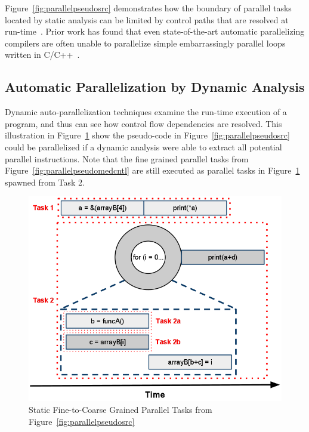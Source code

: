 \documentclass[defaultstyle,11pt]{thesis}
\begin{document}
Figure~\ref{fig:parallelpseudosrc} demonstrates how the boundary of
parallel tasks located by static analysis can be limited by control
paths that are resolved at run-time~\cite{blume:1992:pds}.  Prior work
has found that even state-of-the-art automatic parallelizing compilers
are often unable to parallelize simple embarrassingly parallel loops
written in C/C++~\cite{minjang:10:micro}.

\subsection{Automatic Parallelization by Dynamic Analysis}

Dynamic auto-parallelization techniques examine the run-time execution
of a program, and thus can see how control flow dependencies are
resolved. This illustration in Figure~\ref{fig:parallelpseudocoarse}
show the pseudo-code in Figure~\ref{fig:parallelpseudosrc} could be
parallelized if a dynamic analysis were able to extract all potential
parallel instructions.  Note that the fine grained parallel tasks
from Figure~\ref{fig:parallelpseudomedcntl} are still executed as
parallel tasks in Figure~\ref{fig:parallelpseudocoarse} spawned from
Task 2.

\begin{figure}
\begin{center}
\includegraphics[width=5in]{images/ParallelTasksCoarse}
\end{center}
\caption{Static Fine-to-Coarse Grained Parallel Tasks from Figure~\ref{fig:parallelpseudosrc}}
\label{fig:parallelpseudocoarse}
\end{figure}
\end{document}
